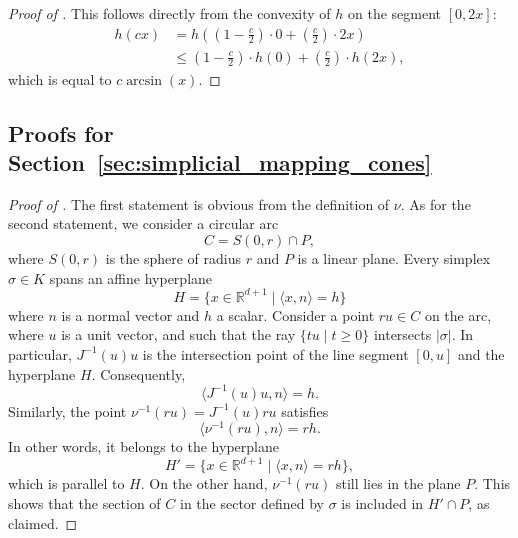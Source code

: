 \documentclass[a4paper,english,cleveref,autoref,thm-restate,nolineno]{socg-lipics-v2021}
\newcommand{\R}{\mathbb R}
\newcommand{\geomreal}[1] { |#1| } %
\begin{document}
\begin{proof}[Proof of ]
	This follows directly from the convexity of $h$ on the segment $[0, 2x]$:
	\begin{align*}
		h(cx) &= h\left(\left(1-\frac{c}{2}\right)\cdot0 + \left(\frac{c}{2}\right)\cdot 2x\right)\\ 
		&\leq \left(1-\frac{c}{2}\right)\cdot h(0) + \left(\frac{c}{2}\right)\cdot h\left(2x\right),
	\end{align*}
	which is equal to $c\arcsin(x)$.
\end{proof}

\subsection{Proofs for Section~\ref*{sec:simplicial_mapping_cones}}

\apothemnormalization*

\begin{proof}[Proof of ]
	\label{proof:apothemnormalization}
	The first statement is obvious from the definition of $\nu$.
	As for the second statement, we consider a circular arc
	\[
	C = S(0,r) \cap P,
	\]
	where $S(0,r)$ is the sphere of radius $r$ and $P$ is a linear plane.
	Every simplex $\sigma\in K$ spans an affine hyperplane
	\[
	H = \{x\in \R^{d+1} \mid \langle x, n\rangle = h\}
	\]
	where $n$ is a normal vector and $h$ a scalar.
	Consider a point $r u \in C$ on the arc, where $u$ is a unit vector, and such that the ray $\{tu\mid t\geq 0\}$ intersects $\geomreal{\sigma}$.
	In particular, $J^{-1}(u)u$ is the intersection point of the line segment $[0,u]$ and the hyperplane $H$.
	Consequently,
	\[
	\langle J^{-1}(u)u, n\rangle = h.
	\]
	Similarly, the point $\nu^{-1}(ru)=J^{-1}(u)ru$ satisfies
	\[
	\langle \nu^{-1}(ru), n\rangle = rh.
	\]
	In other words, it belongs to the hyperplane
	\[
	H' = \{x\in \R^{d+1} \mid \langle x, n\rangle = rh\},
	\]
	which is parallel to $H$.
	On the other hand, $\nu^{-1}(ru)$ still lies in the plane $P$.
	This shows that the section of $C$ in the sector defined by $\sigma$ is included in $H'\cap P$, as claimed.
\end{proof}

\equivalencemappingcones*
\end{document}
